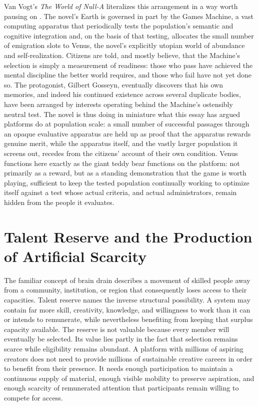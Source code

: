 \documentclass[11pt]{article}
\begin{document}
Van Vogt's \emph{The World of Null-A} literalizes this arrangement in a way worth pausing on \citep{vanvogt1945worldofnulla}. The novel's Earth is governed in part by the Games Machine, a vast computing apparatus that periodically tests the population's semantic and cognitive integration and, on the basis of that testing, allocates the small number of emigration slots to Venus, the novel's explicitly utopian world of abundance and self-realization. Citizens are told, and mostly believe, that the Machine's selection is simply a measurement of readiness: those who pass have achieved the mental discipline the better world requires, and those who fail have not yet done so. The protagonist, Gilbert Gosseyn, eventually discovers that his own memories, and indeed his continued existence across several duplicate bodies, have been arranged by interests operating behind the Machine's ostensibly neutral test. The novel is thus doing in miniature what this essay has argued platforms do at population scale: a small number of successful passages through an opaque evaluative apparatus are held up as proof that the apparatus rewards genuine merit, while the apparatus itself, and the vastly larger population it screens out, recedes from the citizens' account of their own condition. Venus functions here exactly as the giant teddy bear functions on the platform: not primarily as a reward, but as a standing demonstration that the game is worth playing, sufficient to keep the tested population continually working to optimize itself against a test whose actual criteria, and actual administrators, remain hidden from the people it evaluates.

\section{Talent Reserve and the Production of Artificial Scarcity}

The familiar concept of brain drain describes a movement of skilled people away from a community, institution, or region that consequently loses access to their capacities. Talent reserve names the inverse structural possibility. A system may contain far more skill, creativity, knowledge, and willingness to work than it can or intends to remunerate, while nevertheless benefiting from keeping that surplus capacity available. The reserve is not valuable because every member will eventually be selected. Its value lies partly in the fact that selection remains scarce while eligibility remains abundant. A platform with millions of aspiring creators does not need to provide millions of sustainable creative careers in order to benefit from their presence. It needs enough participation to maintain a continuous supply of material, enough visible mobility to preserve aspiration, and enough scarcity of remunerated attention that participants remain willing to compete for access.
\end{document}
